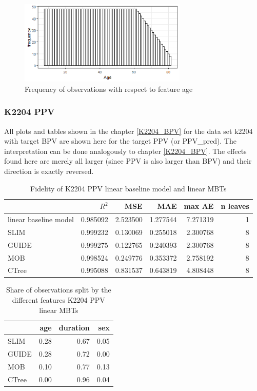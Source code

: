  \begin{figure}[!htb]
    \centering
    \includegraphics[width = 8cm]{Figures/insurance_use_case/k2204_BPV/hist_age.png}
    \caption{Frequency of observations with respect to feature age}
    \label{fig:app_ins_k2204_hist_age}
\end{figure}




\subsubsection{K2204 PPV}
All plots and tables shown in the chapter \ref{K2204_BPV} for the data set k2204 with target BPV are shown here for the target PPV (or PPV\_pred). The interpretation can be done analogously to chapter \ref{K2204_BPV}. The effects found here are merely all larger (since PPV is also larger than BPV) and their direction is exactly reversed. 

\begin{table}[!htb]
\centering \scriptsize
\begin{tabular}[t]{l|r|r|r|r|r}
\hline
  & $R^2$ & MSE & MAE & max AE & n leaves\\
\hline
linear baseline model & 0.985092 & 2.523500 & 1.277544 & 7.271319 & 1\\
\hline
SLIM & 0.999232 & 0.130069 & 0.255018 & 2.300768 & 8\\
GUIDE & 0.999275 & 0.122765 & 0.240393 & 2.300768 & 8\\
MOB & 0.998524 & 0.249776 & 0.353372 & 2.758192 & 8\\
CTree & 0.995088 & 0.831537 & 0.643819 & 4.808448 & 8\\
\hline
\end{tabular}
\label{tab:ins_k2204_ppv_lm_surrogates_perf}
\caption{Fidelity of K2204 PPV linear baseline model and linear MBTs}
\end{table}


\begin{table}[!htb]
\centering \scriptsize
\begin{tabular}[t]{l|r|r|r}
\hline
& age & duration & sex\\
\hline
SLIM & 0.28 & 0.67 & 0.05\\
GUIDE & 0.28 & 0.72 & 0.00\\
MOB & 0.10 & 0.77 & 0.13\\
CTree & 0.00 & 0.96 & 0.04\\
\hline
\end{tabular}
\label{tab:ins_k2204_ppv_lm_surrogates_share}
\caption{Share of observations split by the different features K2204 PPV linear MBTs}
\end{table}



